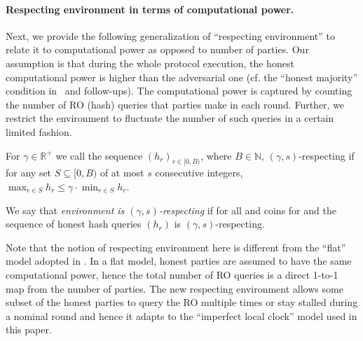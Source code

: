 \paragraph{Respecting environment in terms of computational power.}
%
Next, we provide the following generalization of ``respecting environment'' to relate it to computational power as opposed to number of parties.
%
Our assumption is that during the whole protocol execution, the honest computational power is higher than the adversarial one (cf. the ``honest majority'' condition in~\cite{EC:GarKiaLeo15} and follow-ups).
%
The computational power is captured by counting the number of RO (hash) queries that parties make in each round.
%
Further, we restrict the environment to fluctuate the number of such queries in a certain limited fashion.

\begin{definition} \label{def:respecting-env}
    For $\gamma \in \mathbb{R}^+$ we call the sequence $(h_r)_{r \in [0, B)}$, where $B \in \mathbb{N}$, $(\gamma, s)$-respecting if for any set $S \subseteq [0, B)$ of at most $s$ consecutive integers, $\max_{r \in S} h_r \le \gamma \cdot \min_{r \in S} h_r$.
\end{definition}

We say that \emph{environment \environment is $(\gamma, s)$-respecting} if for all \adv and coins for \environment and \adv the sequence of honest hash queries $(h_r)$ is $(\gamma, s)$-respecting.

Note that the notion of respecting environment here is different from the ``flat'' model adopted in \cite{EC:GarKiaLeo15,C:GarKiaLeo17,EPRINT:GarKiaLeo20,C:BMTZ17}.
%
In a flat model, honest parties are assumed to have the same computational power, hence the total number of RO queries is a direct 1-to-1 map from the number of parties.
%
The new respecting environment allows some subset of the honest parties to query the RO multiple times or stay stalled during a nominal round and hence it adapts to the ``imperfect local clock'' model used in this paper.
